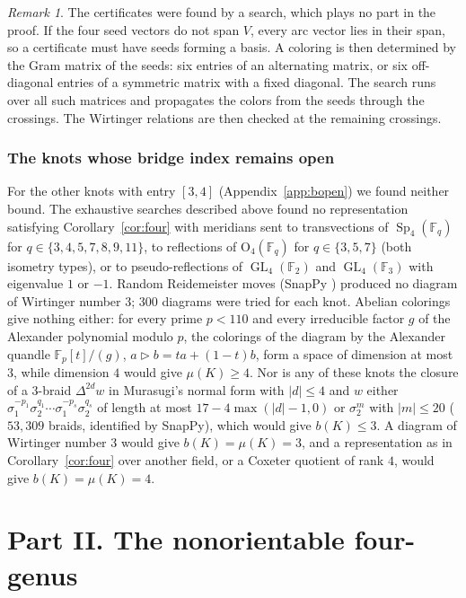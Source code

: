 \documentclass[11pt]{amsart}
\theoremstyle{definition}
\theoremstyle{remark}
\newtheorem{remark}[theorem]{Remark}
\numberwithin{equation}{section}
\newcommand{\F}{\mathbb{F}}
\DeclareMathOperator{\Sp}{Sp}
\DeclareMathOperator{\GL}{GL}
\renewcommand{\O}{\mathrm{O}}
\begin{document}
\begin{remark}
The certificates were found by a search, which plays no part in the proof. If the four
seed vectors do not span $V$, every arc vector lies in their span, so a certificate must
have seeds forming a basis. A coloring is then determined by the Gram matrix of the seeds:
six entries of an alternating matrix, or six off-diagonal entries of a symmetric matrix
with a fixed diagonal. The search runs over all such matrices and propagates the colors
from the seeds through the crossings. The Wirtinger relations are then checked at the
remaining crossings.
\end{remark}

\section{The knots whose bridge index remains open}\label{sec:bopen}

For the other \bopen{} knots with entry $[3,4]$ (Appendix~\ref{app:bopen}) we found
neither bound. The exhaustive searches described above found no representation satisfying
Corollary~\ref{cor:four} with meridians sent to transvections of $\Sp_4(\F_q)$ for
$q\in\{3,4,5,7,8,9,11\}$, to reflections of $\O_4(\F_q)$ for $q\in\{3,5,7\}$ (both
isometry types), or to pseudo-reflections of $\GL_4(\F_2)$ and $\GL_4(\F_3)$ with
eigenvalue $1$ or $-1$. Random Reidemeister moves (SnapPy \cite{SnapPy}) produced no
diagram of Wirtinger number $3$; 300 diagrams were tried for each knot. Abelian colorings
give nothing either: for every prime $p<110$ and every irreducible factor $g$ of the
Alexander polynomial modulo $p$, the colorings of the diagram by the Alexander quandle
$\F_p[t]/(g)$, $a\triangleright b=ta+(1-t)b$, form a space of dimension at most $3$, while
dimension $4$ would give $\mu(K)\ge4$. Nor is any of these knots the closure of a
$3$-braid $\Delta^{2d}w$ in Murasugi's normal form with $|d|\le4$ and $w$ either
$\sigma_1^{-p_1}\sigma_2^{q_1}\cdots\sigma_1^{-p_s}\sigma_2^{q_s}$ of length at most
$17-4\max(|d|-1,0)$ or $\sigma_2^m$ with $|m|\le20$ ($53{,}309$ braids, identified by
SnapPy), which would give $b(K)\le3$. A diagram of Wirtinger number $3$ would give
$b(K)=\mu(K)=3$, and a representation as in Corollary~\ref{cor:four} over another field,
or a Coxeter quotient of rank $4$, would give $b(K)=\mu(K)=4$.

\part*{Part II. The nonorientable four-genus}
\end{document}
